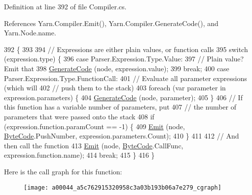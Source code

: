 Definition at line 392 of file Compiler.\-cs.



References Yarn.\-Compiler.\-Emit(), Yarn.\-Compiler.\-Generate\-Code(), and Yarn.\-Node.\-name.


\begin{DoxyCode}
392                                                                    \{
393 
394             \textcolor{comment}{// Expressions are either plain values, or function calls}
395             \textcolor{keywordflow}{switch} (expression.type) \{
396             \textcolor{keywordflow}{case} Parser.Expression.Type.Value:
397                 \textcolor{comment}{// Plain value? Emit that}
398                 \hyperlink{a00044_a006f3becd521cc179ba3d3352f6f930b}{GenerateCode} (node, expression.value);
399                 \textcolor{keywordflow}{break};
400             \textcolor{keywordflow}{case} Parser.Expression.Type.FunctionCall:
401                 \textcolor{comment}{// Evaluate all parameter expressions (which will}
402                 \textcolor{comment}{// push them to the stack)}
403                 \textcolor{keywordflow}{foreach} (var parameter \textcolor{keywordflow}{in} expression.parameters) \{
404                     \hyperlink{a00044_a006f3becd521cc179ba3d3352f6f930b}{GenerateCode} (node, parameter);
405                 \}
406                 \textcolor{comment}{// If this function has a variable number of parameters, put}
407                 \textcolor{comment}{// the number of parameters that were passed onto the stack}
408                 \textcolor{keywordflow}{if} (expression.function.paramCount == -1) \{
409                     \hyperlink{a00044_a774e8c143cdda0584fcfdda98626a83c}{Emit} (node, \hyperlink{a00041_ad5dfb6ee68ca7469623ad3e459f98894}{ByteCode}.PushNumber, expression.parameters.Count);
410                 \}
411 
412                 \textcolor{comment}{// And then call the function}
413                 \hyperlink{a00044_a774e8c143cdda0584fcfdda98626a83c}{Emit} (node, \hyperlink{a00041_ad5dfb6ee68ca7469623ad3e459f98894}{ByteCode}.CallFunc, expression.function.name);
414                 \textcolor{keywordflow}{break};
415             \}
416         \}
\end{DoxyCode}


Here is the call graph for this function\-:
\nopagebreak
\begin{figure}[H]
\begin{center}
\leavevmode
\texttt{[image: a00044\_a5c762915320958c3a03b193b06a7e279\_cgraph]}
\end{center}
\end{figure}


